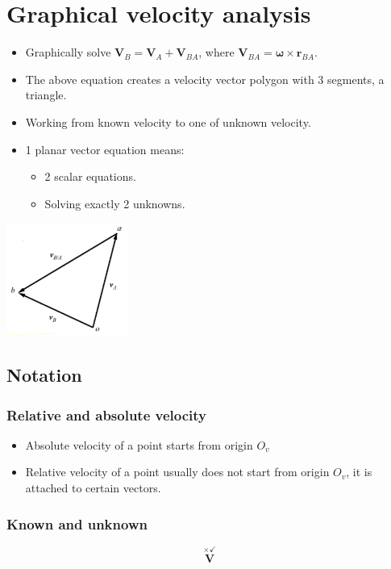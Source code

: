 \documentclass[11pt]{article}
\begin{document}
\section{Graphical velocity analysis}
\label{sec:org3e6075a}
\begin{itemize}
\item Graphically solve \(\boldsymbol{V}_B = \boldsymbol{V}_A + \boldsymbol{V}_{BA}\), where \(\boldsymbol{V}_{BA} = \boldsymbol{\omega} \times \boldsymbol{r}_{BA}\).
\item The above equation creates a velocity vector polygon with 3 segments, a triangle.
\item Working from known velocity to one of unknown velocity.
\item 1 planar vector equation means:
\begin{itemize}
\item 2 scalar equations.
\item Solving exactly 2 unknowns.
\end{itemize}
\end{itemize}

\begin{center}
\includegraphics[height=10em]{./images/graphical-velocity-analysis.png}
\end{center}
\subsection{Notation}
\label{sec:org1ee0ec9}

\subsubsection{Relative and absolute velocity}
\label{sec:org38bddc0}
\begin{itemize}
\item Absolute velocity of a point starts from origin \(O_v\)
\item Relative velocity of a point usually does not start from origin \(O_v\), it is attached to certain vectors.
\end{itemize}
\subsubsection{Known and unknown}
\label{sec:org9ab65cb}
\[\overset{\times \checkmark}{\boldsymbol{V}}\]
\end{document}
